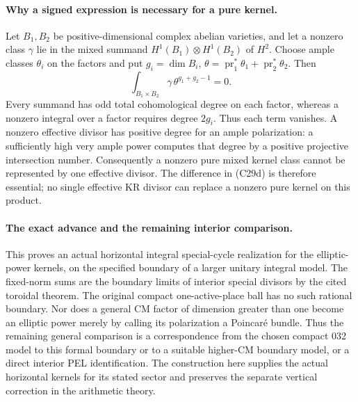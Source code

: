 \paragraph{Why a signed expression is necessary for a pure kernel.}
Let $B_1,B_2$ be positive-dimensional complex abelian
varieties, and let a nonzero class $\gamma$ lie in the
mixed summand $H^1(B_1)\otimes H^1(B_2)$ of $H^2$.
Choose ample classes $\theta_i$ on the factors and put
$g_i=\dim B_i$, $\theta=\operatorname{pr}_1^*\theta_1+
\operatorname{pr}_2^*\theta_2$. Then
\[
       \int_{B_1\times B_2}\gamma\,\theta^{g_1+g_2-1}=0.
 \tag{C29f}
\]
Every summand has odd total cohomological degree on
each factor, whereas a nonzero integral over a factor
requires degree $2g_i$. Thus each term vanishes.
A nonzero effective divisor has positive degree for
an ample polarization: a sufficiently high very ample
power computes that degree by a positive projective
intersection number. Consequently a nonzero pure
mixed kernel class cannot be represented by one
effective divisor. The difference in (C29d) is
therefore essential; no single effective KR divisor
can replace a nonzero pure kernel on this product.

\paragraph{The exact advance and the remaining interior comparison.}
This proves an actual horizontal integral special-cycle
realization for the elliptic-power kernels, on the
specified boundary of a larger unitary integral model.
The fixed-norm sums are the boundary limits of
interior special divisors by the cited toroidal theorem.
The original compact one-active-place ball has no such
rational boundary. Nor does a general CM factor of
dimension greater than one become an elliptic power
merely by calling its polarization a Poincar\'e bundle.
Thus the remaining general comparison is a
correspondence from the chosen compact 032 model to
this formal boundary or to a suitable higher-CM
boundary model, or a direct interior PEL identification.
The construction here supplies the actual horizontal
kernels for its stated sector and preserves the
separate vertical correction in the arithmetic theory.

